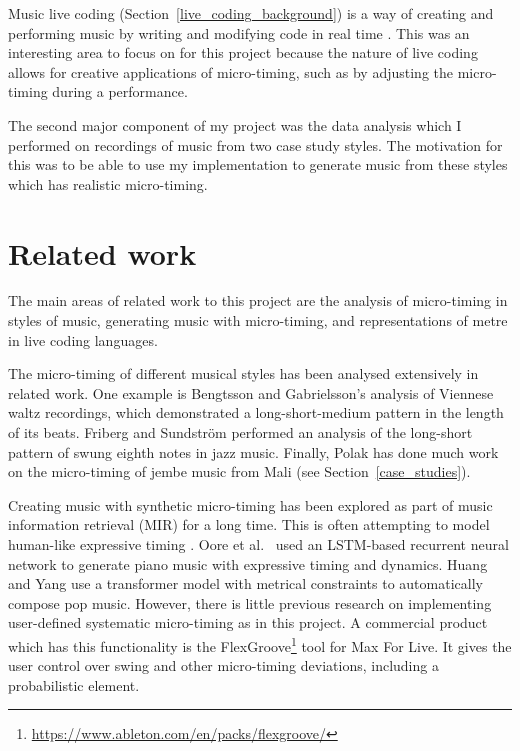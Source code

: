 \documentclass[12pt,twoside,openright]{report}
\begin{document}
Music live coding (Section~\ref{live_coding_background}) is a way of creating and performing music by writing
and modifying code in real time \cite{magnusson2011}. This was an interesting area to focus on for
this project because the nature of live coding allows for creative applications
of micro-timing, such as by adjusting the micro-timing during a performance.

The second major component of my project was the data analysis which I performed
on recordings of music from two case study styles. The motivation for this was
to be able to use my implementation to generate music from these styles which
has realistic micro-timing.



\section{Related work} \label{related_work}

The main areas of related work to this project are the analysis of micro-timing in styles of music, generating music with micro-timing, and representations of metre in live coding languages.

The micro-timing of different musical styles has been analysed extensively in related work. One example is Bengtsson and Gabrielsson's \cite{bengtsson1977} analysis of Viennese waltz recordings, which demonstrated a long-short-medium pattern in the length of its beats. Friberg and Sundström \cite{friberg2002} performed an analysis of the long-short pattern of swung eighth notes in jazz music. Finally, Polak \cite{polak2010,london2017,jacoby2021} has done much work on the micro-timing of jembe music from Mali (see Section~\ref{case_studies}).

Creating music with synthetic micro-timing has been explored as part of music
information retrieval (MIR) for a long time. This is often attempting to model
human-like expressive timing \cite{bilmes1993}. Oore et al.\ \cite{oore2020} used an
LSTM-based recurrent neural network to generate piano music with expressive
timing and dynamics. Huang and Yang \cite{huang2020} use a transformer model with
metrical constraints to automatically compose pop music. However, there is little previous research on implementing user-defined systematic micro-timing as in this project. A commercial product which has this functionality is the FlexGroove\footnote{\url{https://www.ableton.com/en/packs/flexgroove/}} tool for Max For Live. It gives the user
control over swing and other micro-timing deviations, including a probabilistic
element.
\end{document}
